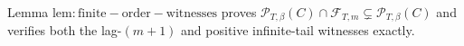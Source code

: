 Lemma \(\mathrm{lem:finite-order-witnesses}\) proves \(\mathcal P_{T,\beta}(C)\cap\mathcal F_{T,m}\subsetneq\mathcal P_{T,\beta}(C)\) and verifies both the lag-\((m+1)\) and positive infinite-tail witnesses exactly.